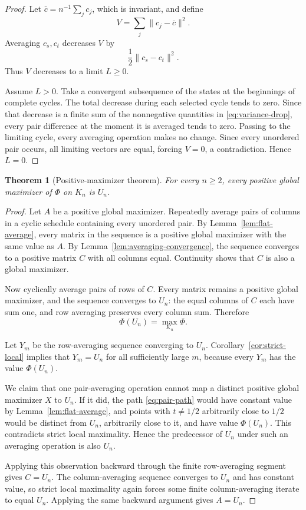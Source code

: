 \documentclass[11pt]{article}
\newtheorem{theorem}{Theorem}[section]
\theoremstyle{definition}
\newcommand{\1}{\mathbf{1}}
\begin{document}
\begin{proof}
Let $\bar c=n^{-1}\sum_jc_j$, which is invariant, and define
\[
 V=\sum_j\|c_j-\bar c\|^2.
\]
Averaging $c_s,c_t$ decreases $V$ by
\[
 \frac12\|c_s-c_t\|^2.
 \tag{4.6}\label{eq:variance-drop}
\]
Thus $V$ decreases to a limit $L\ge0$.

Assume $L>0$.  Take a convergent subsequence of the states at the beginnings of complete cycles.  The total decrease during each selected cycle tends to zero.  Since that decrease is a finite sum of the nonnegative quantities in \eqref{eq:variance-drop}, every pair difference at the moment it is averaged tends to zero.  Passing to the limiting cycle, every averaging operation makes no change.  Since every unordered pair occurs, all limiting vectors are equal, forcing $V=0$, a contradiction.  Hence $L=0$.
\end{proof}

\begin{theorem}[Positive-maximizer theorem]\label{thm:positive-maximizer}
For every $n\ge2$, every positive global maximizer of $\Phi$ on $K_n$ is $U_n$.
\end{theorem}

\begin{proof}
Let $A$ be a positive global maximizer.  Repeatedly average pairs of columns in a cyclic schedule containing every unordered pair.  By Lemma~\ref{lem:flat-average}, every matrix in the sequence is a positive global maximizer with the same value as $A$.  By Lemma~\ref{lem:averaging-convergence}, the sequence converges to a positive matrix $C$ with all columns equal.  Continuity shows that $C$ is also a global maximizer.

Now cyclically average pairs of rows of $C$.  Every matrix remains a positive global maximizer, and the sequence converges to $U_n$: the equal columns of $C$ each have sum one, and row averaging preserves every column sum.  Therefore
\[
 \Phi(U_n)=\max_{K_n}\Phi.
 \tag{4.7}\label{eq:U-global}
\]

Let $Y_m$ be the row-averaging sequence converging to $U_n$.  Corollary~\ref{cor:strict-local} implies that $Y_m=U_n$ for all sufficiently large $m$, because every $Y_m$ has the value $\Phi(U_n)$.

We claim that one pair-averaging operation cannot map a distinct positive global maximizer $X$ to $U_n$.  If it did, the path \eqref{eq:pair-path} would have constant value by Lemma~\ref{lem:flat-average}, and points with $t\ne1/2$ arbitrarily close to $1/2$ would be distinct from $U_n$, arbitrarily close to it, and have value $\Phi(U_n)$.  This contradicts strict local maximality.  Hence the predecessor of $U_n$ under such an averaging operation is also $U_n$.

Applying this observation backward through the finite row-averaging segment gives $C=U_n$.  The column-averaging sequence converges to $U_n$ and has constant value, so strict local maximality again forces some finite column-averaging iterate to equal $U_n$.  Applying the same backward argument gives $A=U_n$.
\end{proof}
\end{document}
